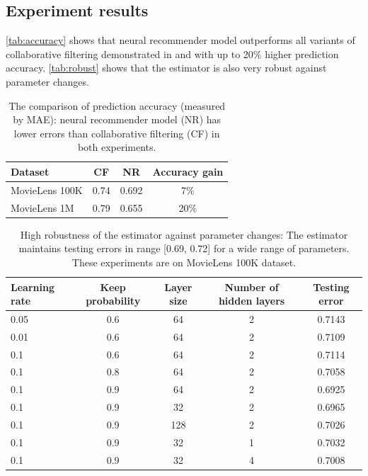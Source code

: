 \documentclass[twocolumn]{article}
\begin{document}
\subsection{Experiment results}
\autoref{tab:accuracy} shows that neural recommender model outperforms all 
variants of collaborative filtering demonstrated in \cite{hwang2016efficient} 
and \cite{polatidis2016multi} with up to 20\% higher prediction accuracy.
\autoref{tab:robust} shows that the estimator is also very robust against 
parameter changes.
\begin{table}[h]
	\centering
	\caption{The comparison of prediction accuracy (measured by MAE):
		neural recommender model (NR) has lower errors than collaborative 
		filtering (CF) in both experiments.}
	\begin{tabularx}{0.5\textwidth}{ |X|c|c|c| }  \hline
		\textbf{Dataset} & \textbf{CF} & \textbf{NR} & \textbf{Accuracy gain} 
		\\ \hline
		MovieLens 100K & 0.74 & 0.692 & 7\% \\ \hline
		MovieLens 1M & 0.79 & 0.655 & 20\% \\ \hline
	\end{tabularx}
	\label{tab:accuracy}
\end{table}
\begin{table}[h]
	\centering
	\caption{High robustness of the estimator against parameter changes: 
		The estimator maintains testing errors in range [0.69, 0.72] for a wide 
		range of parameters. These experiments are on MovieLens 100K dataset.}
	\begin{tabularx}{\textwidth}{ |X|c|c|c|c| }  \hline
		 \textbf{Learning rate} & \textbf{Keep probability} & \textbf{Layer 
		 size} & \textbf{Number of hidden layers} & \textbf{Testing error} \\ 
		 \hline
		 0.05 & 0.6 & 64 & 2 & 0.7143 \\ \hline
		 0.01 & 0.6 & 64 & 2 & 0.7109 \\ \hline
		 0.1 & 0.6 & 64 & 2 & 0.7114 \\ \hline
		 0.1 & 0.8 & 64 & 2 & 0.7058 \\ \hline
		 0.1 & 0.9 & 64 & 2 & 0.6925 \\ \hline
		 0.1 & 0.9 & 32 & 2 & 0.6965 \\ \hline
		 0.1 & 0.9 & 128 & 2 & 0.7026 \\ \hline
		 0.1 & 0.9 & 32 & 1 & 0.7032 \\ \hline
		 0.1 & 0.9 & 32 & 4 & 0.7008 \\ \hline
	\end{tabularx}
	\label{tab:robust}
\end{table}
\end{document}
